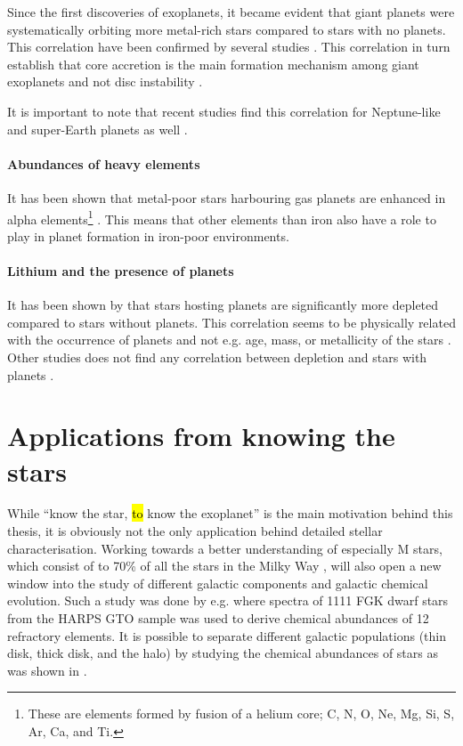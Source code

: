 Since the first discoveries of exoplanets, it became evident that giant planets were systematically
orbiting more metal-rich stars compared to stars with no planets. This correlation have been
confirmed by several studies \citep{Gonzalez1997,Santos2004,Fischer2005,Sousa2008a,Mortier2013b}.
This correlation in turn establish that core accretion is the main formation mechanism among giant
exoplanets \citep{Pollack1996,Ida2004,Mordasini2012} and not disc instability \citep{Boss2002}.

It is important to note that recent studies find this correlation for Neptune-like and
super-Earth planets as well \citep{Wang2015,Zhu2016}.

\paragraph{Abundances of heavy elements}

It has been shown that metal-poor stars harbouring gas planets are enhanced in alpha
elements\footnote{These are elements formed by fusion of a helium core; C, N, O, Ne, Mg, Si, S, Ar,
Ca, and Ti.} \citep[see e.g.][]{Adibekyan2012a}. This means that other elements than iron also have
a role to play in planet formation in iron-poor environments.


\paragraph{Lithium and the presence of planets}

It has been shown by \citet{Israelian2004,Delgado2014,Gonzalez2015,Takeda2005} that stars hosting
planets are significantly more  depleted compared to stars without planets. This
correlation seems to be physically related with the occurrence of planets and not e.g. age, mass, or
metallicity of the stars \citep{Sousa2010}. Other studies does not find any correlation between
 depletion and stars with planets \citep{Baumann2010,Ramirez2012}.



\section{Applications from knowing the stars}
\label{sec:stars_application}

While ``know the star, \hl{to} know the exoplanet'' is the main motivation behind this thesis, it is
obviously not the only application behind detailed stellar characterisation. Working towards a
better understanding of especially M stars, which consist of to 70\% of all the stars in the Milky
Way \citep{Bochanski2010}, will also open a new window into the study of different galactic
components and galactic chemical evolution. Such a study was done by e.g.
\citet{Adibekyan2012,Delgado2017} where spectra of 1111 FGK dwarf stars from the HARPS GTO sample
was used to derive chemical abundances of 12 refractory elements. It is possible to separate
different galactic populations (thin disk, thick disk, and the halo) by studying the chemical
abundances of stars as was shown in \citet{Adibekyan2012}.

